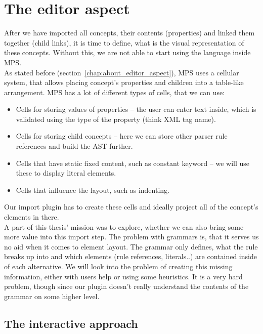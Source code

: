 \section{The editor aspect}
\label{chap:editor_aspect}

After we have imported all concepts, their contents (properties) and linked them together (child links), it is time to define, what is the visual representation of these concepts.
Without this, we are not able to start using the language inside MPS.
\\

As stated before (section~\ref{chap:about_editor_aspect}), MPS uses a cellular system, that allows placing concept's properties and children into a table-like arrangement.
MPS has a lot of different types of cells, that we can use:

\begin{itemize}
	\item Cells for storing values of properties -- the user can enter text inside, which is validated using the type of the property (think XML tag name).
	
	\item Cells for storing child concepts -- here we can store other parser rule references and build the AST further.
	
	\item Cells that have static fixed content, such as constant keyword -- we will use these to display literal elements.
	
	\item Cells that influence the layout, such as indenting.
\end{itemize}

Our import plugin has to create these cells and ideally project all of the concept's elements in there.
\\

A part of this thesis' mission was to explore, whether we can also bring some more value into this import step.
The problem with grammars is, that it serves us no aid when it comes to element layout.
The grammar only defines, what the rule breaks up into and which elements (rule references, literals..) are contained inside of each alternative.
We will look into the problem of creating this missing information, either with users help or using some heuristics.
It is a very hard problem, though since our plugin doesn't really understand the contents of the grammar on some higher level.

\subsection{The interactive approach}

